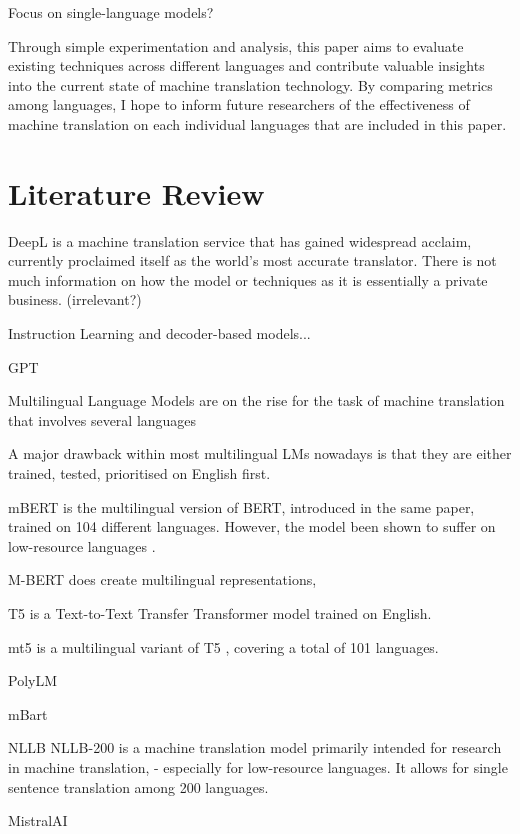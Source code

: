 \documentclass[a4paper]{article}
\begin{document}
Focus on single-language models?

Through simple experimentation and analysis, this paper aims to evaluate existing techniques across different languages
and contribute valuable insights into the current state of machine translation technology. By comparing metrics among languages, I hope to inform future researchers of the effectiveness of machine translation on each individual languages that are included in this paper.

\section{Literature Review}

DeepL \cite{deepl} is a machine translation service that has gained widespread acclaim, currently proclaimed itself as the world's most accurate translator. There is not much information on how the model or techniques as it is essentially a private business. (irrelevant?)


Instruction Learning and decoder-based models...

GPT \cite{openai-2024-gpt4}

Multilingual Language Models are on the rise for the task of machine translation that involves several languages

A major drawback within most multilingual LMs nowadays is that they are either trained, tested, prioritised on English first.


mBERT \cite{devlin-2019-bert} is the multilingual version of BERT, introduced in the same paper, trained on 104 different languages. However, the model been shown to suffer on low-resource languages \cite{wu-2020-mbert-are-all}.

M-BERT
does create multilingual representations,

T5 \cite{raffel-2023-t5} is a Text-to-Text Transfer Transformer model trained on English.

mt5 \cite{xue-2021-mt5} is a multilingual variant of T5 \cite{raffel-2023-t5}, covering a total of 101 languages.

PolyLM \cite{wei-2023-polylm}

mBart \cite{liu-2020-mbart}

NLLB \cite{nllb200}
NLLB-200 is a machine translation model primarily intended for research in machine translation, - especially for low-resource languages. It allows for single sentence translation among 200 languages.

MistralAI \cite{jiang-2023-mistral-7b}
\end{document}
